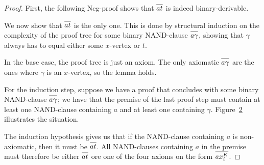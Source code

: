\begin{proof}
First, the following Neg-proof shows that $\ol{at}$ is indeed binary-derivable.
\begin{figure}[!h]
  \centering
  \begin{prooftree*}[separation=0.8em, rule margin=1ex]
  \end{prooftree*}
  \caption{}
  \label{fig:at_binary_proof}
\end{figure}
\FloatBarrier
We now show that $\ol{at}$ is the only one.
This is done by structural induction on the complexity of the proof tree for some binary NAND-clause $\ol{a\gamma}$, showing that $\gamma$ always has to equal either some $x$-vertex or $t$.

In the base case, the proof tree is just an axiom.
The only axiomatic $\ol{a\gamma}$ are the ones where $\gamma$ is an $x$-vertex, so the lemma holds.

For the induction step, suppose we have a proof that concludes with some binary NAND-clause $\ol{a\gamma}$;
we have that the premise of the last proof step must contain at least one NAND-clause containing $a$ and at least one containing $\gamma$.
Figure~\ref{fig:nand_base_case} illustrates the situation.\par
\begin{figure}[!h]
  \centering
  \begin{prooftree*}
    \Hypo{\dots}
    \Hypo{\dots}
  \end{prooftree*}
  \caption{}
  \label{fig:nand_base_case}
\end{figure}

The induction hypothesis gives us that if the NAND-clause containing $a$ is non-axiomatic, then it must be $\ol{at}$.
All NAND-clauses containing $a$ in the premise must therefore be either $\ol{at}$ ore one of the four axioms on the form $\ol{ax^K_i}$.


\end{proof}
